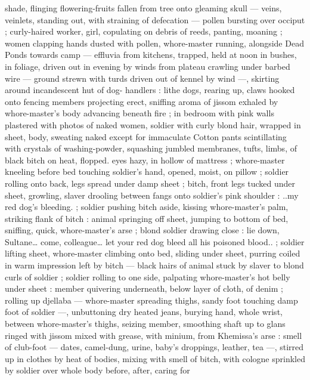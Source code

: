 shade, flinging flowering-fruits fallen from tree onto gleaming skull 
--- veins, veinlets, standing out, with straining of defecation --- 
pollen bursting over occiput ; curly-haired worker, girl, copulating on 
debris of reeds, panting, moaning ; women clapping hands dusted 
with pollen, whore-master running, alongside {\gl} Dead Ponds {\gr} 
towards camp --- effluvia from kitchens, trapped, held at noon in 
bushes, in foliage, driven out in evening by winds from plateau 
crawling under barbed wire --- ground strewn with turds driven out 
of kennel by wind ---, skirting around incandescent hut of dog- 
handlers : lithe dogs, rearing up, claws hooked onto fencing 
members projecting erect, sniffing aroma of jissom exhaled by 
whore-master's body advancing beneath fire ; in bedroom with pink 
walls plastered with photos of naked women, soldier with curly blond 
hair, wrapped in sheet, body, sweating naked except for immaculate 
Cotton pants scintillating with crystals of washing-powder, squashing 
jumbled membranes, tufts, limbs, of black bitch on heat, flopped. 
eyes hazy, in hollow of mattress ; whore-master kneeling before bed 
touching soldier's hand, opened, moist, on pillow ; soldier rolling 
onto back, legs spread under damp sheet ; bitch, front legs tucked 
under sheet, growling, slaver drooling between fangs onto soldier's 
pink shoulder : {\td} {\gl}..my red dog's bleeding.{\gr} ; soldier pushing bitch 
aside, kissing whore-master's palm, striking flank of bitch : animal 
springing off sheet, jumping to bottom of bed, sniffing, quick, 
whore-master's arse ; blond soldier drawing close : {\td} {\gl} {\td} lie down, 
Sultane{\ldots} come, colleague{\ldots} let your red dog bleed all his poisoned 
blood..{\gr} ; soldier lifting sheet, whore-master climbing onto bed, 
sliding under sheet, purring coiled in warm impression left by bitch 
--- black hairs of animal stuck by slaver to blond curls of soldier ; 
soldier rolling to one side, palpating whore-master's hot belly under 
sheet : member quivering underneath, below layer of cloth, of denim 
; rolling up djellaba --- whore-master spreading thighs, sandy foot 
touching damp foot of soldier ---, unbuttoning dry heated jeans, 
burying hand, whole wrist, between whore-master's thighs, seizing 
member, smoothing shaft up to glans ringed with jissom mixed with 
grease, with minium, from Khemissa's arse : smell of club-foot --- 
dates, camel-dung, urine, baby's droppings, leather, tea ---, stirred 
up in clothes by heat of bodies, mixing with smell of bitch, with 
cologne sprinkled by soldier over whole body before, after, caring for 
